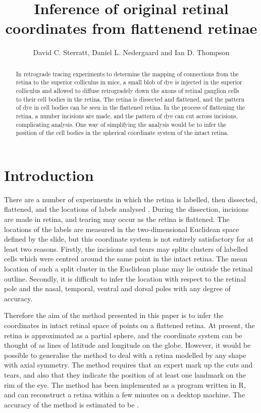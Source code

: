 \documentclass{article}
\title{Inference of original retinal coordinates from  flattenend
  retinae}
\author{David C. Sterratt, Daniel L. Nedergaard and Ian D. Thompson}
\begin{document}
\maketitle
\thispagestyle{myheadings}

\begin{abstract}
  In retrograde tracing experiments to determine the mapping of
  connections from the retina to the superior colliculus in mice, a
  small blob of dye is injected in the superior colliculus and allowed
  to diffuse retrogradely down the axons of retinal ganglion cells to
  their cell bodies in the retina. The retina is dissected and
  flattened, and the pattern of dye in cell bodies can be seen in the
  flattened retina.  In the process of flattening the retina, a number
  incisions are made, and the pattern of dye can cut across incisions,
  complicating analysis.  One way of simplifying the analysis would be
  to infer the position of the cell bodies in the spherical coordinate
  system of the intact retina.  
\end{abstract}

\section{Introduction}
\label{fold-sphere:sec:introduction}

There are a number of experiments in which the retina is labelled,
then dissected, flattened, and the locations of labels analysed
\citep{RashEtal05oppo} .
During the dissection, incisions are made in retina, and tearing may
occur as the retina is flattened. The locations of the labels are
measured in the two-dimensional Euclidean space defined by the slide,
but this coordinate system is not entirely satisfactory for at least
two reasons. Firstly, the incisions and tears may splits clusters of
labelled cells which were centred around the same point in the intact
retina. The mean location of such a split cluster in the Euclidean
plane may lie outside the retinal outline. Secondly, it is difficult
to infer the location with respect to the retinal pole and the nasal,
temporal, ventral and dorsal poles with any degree of accuracy.

Therefore the aim of the method presented in this paper is to infer
the coordinates in intact retinal space of points on a flattened
retina. At present, the retina is approximated as a partial sphere,
and the coordinate system can be thought of as lines of latitude and
longitude on the globe. However, it would be possible to generalise
the method to deal with a retina modelled by any shape with axial
symmetry.  The method requires that an expert mark up the cuts and
tears, and also that they indicate the position of at least one
landmark on the rim of the eye. The method has been implemented as a
program written in R, and can reconstruct a retina within a few
minutes on a desktop machine. The accuracy of the method is estimated
to be .
\end{document}
